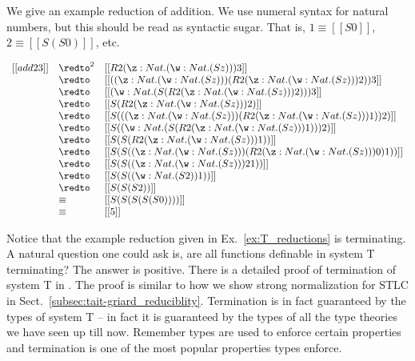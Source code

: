 \begin{example}
  \label{ex:T_reductions}
  We give an example reduction of addition.  We use numeral
  syntax for natural numbers, but this should be read as syntactic
  sugar.  That is, $1 \equiv [[S 0]]$, $2 \equiv [[S (S 0)]]$, etc.
  \begin{center}
    \begin{math}
      \begin{array}{lll}
        [[add 2 3]] & \redto^2 &  [[R 2 (\z:Nat.(\w:Nat.(S z))) 3]]\\
             & \redto   & [[((\z:Nat.(\w:Nat.(S z))) (R 2 (\z:Nat.(\w:Nat.(S z))) 2)) 3]]\\
             & \redto   & [[(\w:Nat.(S (R 2 (\z:Nat.(\w:Nat.(S z))) 2))) 3]]\\
             & \redto   & [[S (R 2 (\z:Nat.(\w:Nat.(S z))) 2)]]\\
             & \redto   & [[S (((\z:Nat.(\w:Nat.(S z))) (R 2 (\z:Nat.(\w:Nat.(S z))) 1)) 2)]]\\
             & \redto   & [[S ((\w:Nat.(S (R 2 (\z:Nat.(\w:Nat.(S z))) 1))) 2)]]\\
             & \redto   & [[S (S (R 2 (\z:Nat.(\w:Nat.(S z))) 1))]]\\
             & \redto   & [[S (S ((\z:Nat.(\w:Nat.(S z))) (R 2 (\z:Nat.(\w:Nat.(S z))) 0) 1))]]\\
             & \redto   & [[S (S ((\z:Nat.(\w:Nat.(S z))) 2 1))]]\\
             & \redto   & [[S (S ((\w:Nat.(S 2)) 1))]]\\
             & \redto   & [[S (S (S 2))]] \\
             & \equiv   & [[S (S (S (S (S 0))))]] \\
             & \equiv   & [[5]]
      \end{array}
    \end{math}
  \end{center}
\end{example}

Notice that the example reduction given in Ex.~\ref{ex:T_reductions}
is terminating.  A natural question one could ask is, are all
functions definable in system T terminating?  The answer is positive.
There is a detailed proof of termination of system T in
\cite{Girard:1989}.  The proof is similar to how we show strong
normalization for STLC in
Sect.~\ref{subsec:tait-griard_reduciblity}. Termination is in fact
guaranteed by the types of system T -- in fact it is guaranteed by the
types of all the type theories we have seen up till now.  Remember
types are used to enforce certain properties and termination is one of
the most popular properties types enforce.
